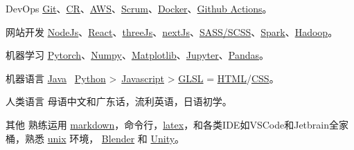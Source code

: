 
\begin{cvskills}

  \cvskill
    {DevOps} %
    {\href{https://git-scm.com/}{Git}、\href{https://en.wikipedia.org/wiki/Code_review}{CR}、\href{https://aws.amazon.com/}{AWS}、\href{https://www.scrum.org/resources/what-is-scrum}{Scrum}、\href{https://www.docker.com/}{Docker}、\href{https://github.com/features/actions}{Github Actions}。}

  \cvskill
    {网站开发} %
    {\href{https://nodejs.org/en/}{NodeJs}、\href{https://reactjs.org/}{React}、\href{https://threejs.org/}{threeJs}、\href{https://nextjs.org/}{nextJs}、\href{https://sass-lang.com/}{SASS/SCSS}、\href{https://spark.apache.org/}{Spark}、\href{https://hadoop.apache.org/}{Hadoop}。}

  \cvskill
    {机器学习} %
    {\href{https://pytorch.org/}{Pytorch}、\href{https://numpy.org/}{Numpy}、\href{https://matplotlib.org/}{Matplotlib}、\href{https://jupyter.org/}{Jupyter}、\href{https://pandas.pydata.org/}{Pandas}。}  %

  \cvskill
    {机器语言}
    {\href{https://www.java.com/en/}{Java} \gtrsim\, \href{https://www.python.org/}{Python} >\, \href{https://www.javascript.com/}{Javascript} > \href{https://www.khronos.org/opengl/wiki/OpenGL_Shading_Language}{GLSL} = \href{https://developer.mozilla.org/en-US/docs/Glossary/HTML5}{HTML}/\href{https://developer.mozilla.org/en-US/docs/Web/CSS}{CSS}。}

  \cvskill
    {人类语言}
    {母语中文和广东话，流利英语，日语初学。}

  \cvskill
    {其他} %
    {熟练运用 \href{https://en.wikipedia.org/wiki/Markdown}{markdown}，命令行，\href{https://www.latex-project.org/}{latex}，和各类IDE如VSCode和Jetbrain全家桶，熟悉 \href{https://en.wikipedia.org/wiki/Unix}{unix} 环境， \href{https://www.blender.org/}{Blender} 和 \href{https://unity.com/}{Unity}。}

\end{cvskills}
